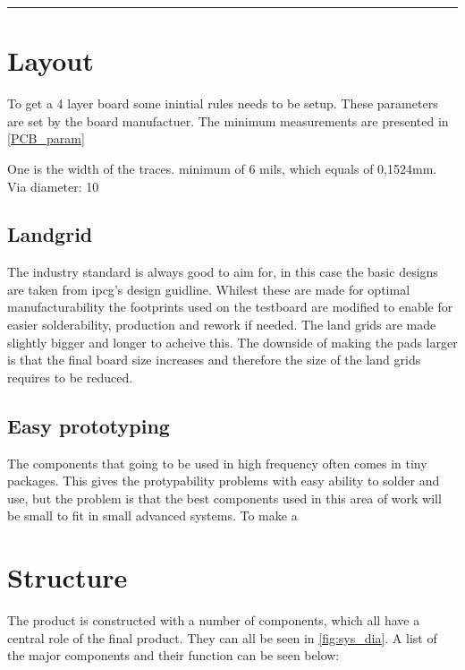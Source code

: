 
\vspace{-10ex}%
\rule{\textwidth}{0.3pt}
\vspace{10ex}
 

\section{Layout}
To get a 4 layer board some inintial rules needs to be setup. These parameters are set by the board manufactuer. The minimum measurements are presented in \autoref{PCB_param}

One is the width of the traces. minimum of 6 mils, which equals of 0,1524mm. 
Via diameter: 10
 
\subsection{Landgrid}
The industry standard is always good to aim for, in this case the basic designs are taken from \gls{ipcg}'s design guidline\cite{ipcg}. Whilest these are made for optimal manufacturability the footprints used on the testboard are modified to enable for easier solderability, production and rework if needed. The land grids are made slightly bigger and longer to acheive this. The downside of making the pads larger is that the final board size increases and therefore the size of the land grids requires to be reduced.

\subsection{Easy prototyping}
The components that going to be used in high frequency often comes in tiny packages. This gives the protypability problems with easy ability to solder and use, but the problem is that the best components used in this area of work will be small to fit in small advanced systems. To make a

\section{Structure}
The product is constructed with a number of components, which all have a central role of the final product. They can all be seen in \autoref{fig:sys_dia}. A list of the major components and their function can be seen below:

